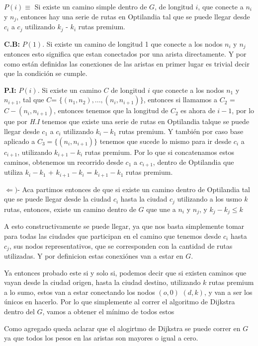 \documentclass{article}
\begin{document}
\par{$P(i) \equiv $ Si existe un camino simple dentro de $G$, de longitud $i$, que conecte a $n_{i}$ y $n_{j}$, entonces hay una serie de rutas en Optilandia tal que se puede llegar desde $c_{i}$ a $c_{j}$ utilizando $k_{j}$ - $k_{i}$ rutas premium. }
\medskip
\medskip
\par{\textbf{C.B:} $P(1)$. Si existe un camino de longitud 1 que conecte a los nodos $n_{i}$ y $n_{j}$ entonces esto significa que estan conectados por una arista directamente. Y por como están definidas  las conexiones de las aristas en primer lugar es trivial decir que la condición se cumple. }
\medskip
\medskip
\par{\textbf{P.I:} $P(i)$. Si existe un camino $C$ de longitud $i$ que conecte a los nodos $n_{1}$ y $n_{i+1}$, tal que $C$= $\{(n_{1}, n_{2}), ... ,(n_{i}, n_{i+1})\}$, entonces si llamamos a $C_{2}$ = $C-(n_{i}, n_{i+1})$, entonces tenemos que la longitud de $C_{2}$ es ahora de $i-1$, por lo que por \textit{H.I} tenemos que existe una serie de rutas en Optilandia talque se puede llegar desde $c_{1}$ a $c_{i}$ utilizando $k_{i} - k_{1}$ rutas premium. Y también por caso base aplicado a $C_{3}=\{(n_{i}, n_{i+1})\}$ tenemos que sucede lo mismo para ir desde $c_{i}$ a $c_{i+1}$, utilizando  $k_{i+1} - k_{i}$ rutas premium. Por lo que si concatenamos estos caminos, obtenemos un recorrido desde $c_{1}$ a $c_{i+1}$, dentro de Optilandia que utiliza $k_{i} - k_{1}$ +  $k_{i+1} - k_{i}$ = $k_{i+1} - k_{1}$ rutas premium. }
\medskip
\medskip
\medskip
\medskip
\medskip
\medskip
\par{$\Leftarrow)$- Aca partimos entonces de que si existe un camino dentro de Optilandia tal que se puede llegar desde la ciudad $c_{i}$ hasta la ciudad $c_{j}$ utilizando a los usmo $k$ rutas, entonces, existe un camino dentro de $G$ que une a $n_{i}$ y $n_{j}$, y $k_{j} - k_{j} \leq k $ }
\par{A esto constructivamente se puede llegar, ya que nos basta simplemente tomar para todas las ciudades que participan en el camino que tenemos desde $c_{i}$ hasta $c_{j}$, sus nodos representativos, que se corresponden con la cantidad de rutas utilizadas. Y por definicion estas conexiónes van a estar en $G$.}
\medskip
\medskip
\medskip
\medskip
\medskip
\medskip
\par{Ya entonces probado este si y solo si, podemos decir que si existen caminos que vayan desde la ciudad origen, hasta la ciudad destino, utilizando $k$ rutas premium a lo sumo, estos van a estar conectando los nodos $(o,0)$ $(d,k)$, y van a ser los únicos en hacerlo. Por lo que simplemente al correr el algoritmo de Dijkstra dentro del $G$, vamos a obtener el mínimo de todos estos}
\par{Como agregado queda aclarar que el alogirtmo de Dijkstra se puede correr en $G$ ya que todos los pesos en las aristas son mayores o igual a cero.}
\end{document}
